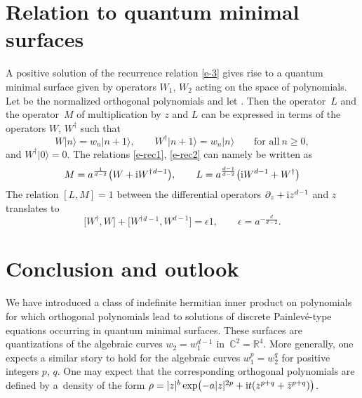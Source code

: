 \documentclass[pdftex]{sigma}
\numberwithin{equation}{section}
\theoremstyle{definition}
\begin{document}
\section{Relation to quantum minimal surfaces}\label{s-5}
A positive solution of the recurrence relation \eqref{e-3} gives rise to a quantum minimal surface given by operators $W_1$, $W_2$ acting on the space of polynomials. Let
be the normalized orthogonal polynomials and let . Then the
operator~$L$ and the operator~$M$ of multiplication by $z$ and $L$ can be expressed in terms of the operators $W$, $W^\dagger$ such that
\[
W|n\rangle=w_n|n+1\rangle,\qquad W^{\dagger}|n+1\rangle=w_n|n\rangle \qquad \text{for all}\ n\geq0,
\]
and $W^\dagger|0\rangle=0$.
The relations \eqref{e-rec1}, \eqref{e-rec2} can namely be written as
\begin{align*}
 M = a^{{\frac1{d-2}}}\bigl(W+{\rm i}W^\dagger{}^{d-1}\bigr),
\qquad
 L = a^{{\frac{d-1}{d-2}}}\bigl({\rm i}W^{d-1}+W^\dagger\bigr)
\end{align*}
The relation $[L,M]=1$ between the differential operators $\partial_z+{\rm i}z^{d-1}$ and $z$ translates to
\[
\big[W^\dagger,W\big]+\big[W^\dagger{}^{d-1},W^{d-1}\big]=\epsilon 1, \qquad \epsilon=a^{-\frac{d}{d-2}}.
\]

\section{Conclusion and outlook}\label{s-6}
We have introduced a class of indefinite hermitian inner product on polynomials for which orthogonal polynomials lead to solutions of discrete Painlev\'e-type equations occurring in quantum minimal surfaces. These surfaces are quantizations of the algebraic curves $w_2=w_1^{d-1}$ in~${\mathbb C^2=\mathbb R^4}$. More generally, one expects a similar story to hold for the algebraic curves $w_1^p=w_2^q$ for positive integers $p$, $q$. One may expect that the corresponding orthogonal polynomials are defined by a~density of the form $\rho=|z|^b\exp\bigl(-a|z|^{2p}+{\rm i}t(z^{p+q}+\bar z^{p+q})\bigr)$.
\end{document}
